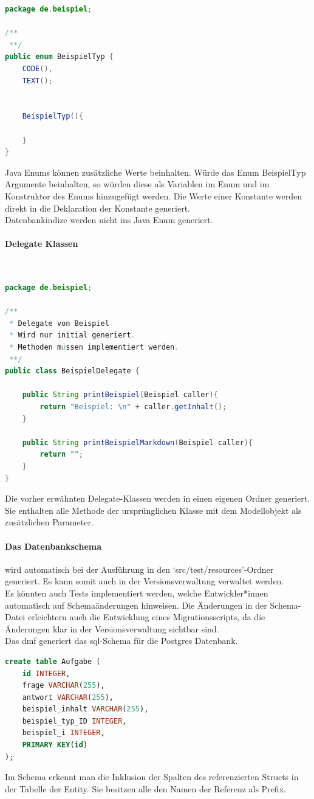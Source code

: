 \documentclass[./einleitung.tex]{subfiles}
\begin{document}
    \begin{lstlisting}[language=Java, caption=BeispielTyp.java, label=lst:beispielTypJava]
package de.beispiel;

/**
 **/
public enum BeispielTyp {
    CODE(),
    TEXT();


    BeispielTyp(){

    }
}
    \end{lstlisting}
    Java Enums können zusätzliche Werte beinhalten.
    Würde das Enum BeispielTyp Argumente beinhalten, so würden diese als Variablen im Enum und im Konstruktor des Enums hinzugefügt werden.
    Die Werte einer Konstante werden direkt in die Deklaration der Konstante generiert.\\
    Datenbankindize werden nicht ins Java Enum generiert.
    
    \paragraph{Delegate Klassen}\mbox{}\\
    \begin{lstlisting}[language=Java, caption=BeispielDelegate.java, label=lst:beispielDelegateJava]
package de.beispiel;

/**
 * Delegate von Beispiel
 * Wird nur initial generiert.
 * Methoden müssen implementiert werden.
 **/
public class BeispielDelegate {

    public String printBeispiel(Beispiel caller){
        return "Beispiel: \n" + caller.getInhalt();
    }

    public String printBeispielMarkdown(Beispiel caller){
        return "";
    }
}
    \end{lstlisting}
    Die vorher erwähnten Delegate-Klassen werden in einen eigenen Ordner generiert.
    Sie enthalten alle Methode der ursprünglichen Klasse mit dem Modellobjekt als zusätzlichen Parameter.

    \paragraph{Das Datenbankschema} wird automatisch bei der Ausführung in den `src/test/resources'-Ordner generiert.
    Es kann somit auch in der Versionsverwaltung verwaltet werden.\\
    Es könnten auch Tests implementiert werden, welche Entwickler*innen automatisch auf Schemaänderungen hinweisen.
    Die Änderungen in der Schema-Datei erleichtern auch die Entwicklung eines Migrationsscripts, da die Änderungen klar in der Versionsverwaltung sichtbar sind.\\
    Das \acrshort{dmf} generiert das \acrshort{sql}-Schema für die Postgres Datenbank.
    \begin{lstlisting}[language=sql, caption=schema.sql, label=lst:schemaSQL]
create table Aufgabe (
    id INTEGER,
    frage VARCHAR(255),
    antwort VARCHAR(255),
    beispiel_inhalt VARCHAR(255),
    beispiel_typ_ID INTEGER,
    beispiel_i INTEGER,
    PRIMARY KEY(id)
);
    \end{lstlisting}
    Im Schema erkennt man die Inklusion der Spalten des referenzierten Structs in der Tabelle der Entity.
    Sie besitzen alle den Namen der Referenz als Prefix.
\end{document}
